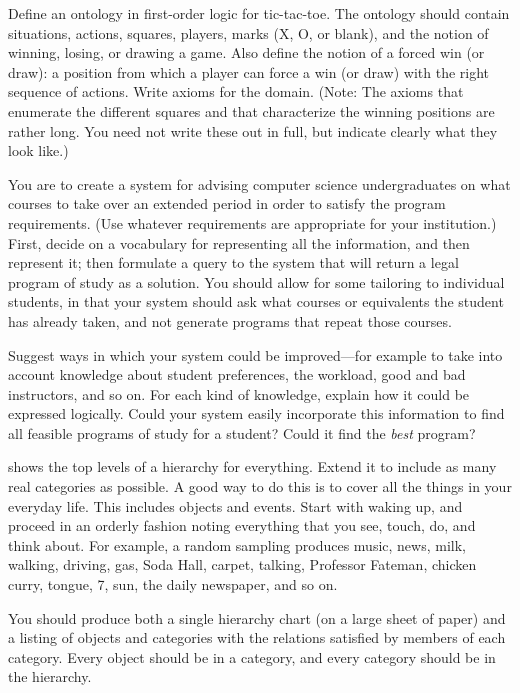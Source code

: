 
\begin{exercise}
Define an ontology in first-order logic for tic-tac-toe.  The ontology
should contain situations, actions, squares, players, marks (X, O, or
blank), and the notion of winning, losing, or drawing a game. Also
define the notion of a forced win (or draw): a position from which a
player can force a win (or draw) with the right sequence of actions.
Write axioms for the domain. (Note: The axioms that enumerate the
different squares and that characterize the winning positions are
rather long.  You need not write these out in full, but indicate
clearly what they look like.)
\end{exercise} 

\begin{iexercise}
You are to create a system for advising computer science
undergraduates on what courses to take over an extended period in
order to satisfy the program requirements. (Use whatever requirements
are appropriate for your institution.)  First, decide on a vocabulary
for representing all the information, and then represent it; then formulate
a query to the system that will return a legal program
of study as a solution. You should allow for some tailoring to
individual students, in that your system should ask what courses or
equivalents the student has already taken, and not generate programs
that repeat those courses.

Suggest ways in which your system could be improved---for example to
take into account knowledge about student preferences, the workload, good
and bad instructors, and so on. For each kind of knowledge, explain
how it could be expressed logically. Could your system easily
incorporate this information to find all feasible programs of study for a student?
Could it find the {\it best} program?
\end{iexercise} 

\begin{uexercise}
 shows the top levels of a hierarchy for
everything. Extend it to include as many real categories as possible.
A good way to do this is to cover all the things in your everyday
life.  This includes objects and events. Start with waking up, and
proceed in an orderly fashion noting everything that you see, touch,
do, and think about.  For example, a random sampling produces music,
news, milk, walking, driving, gas, Soda Hall, carpet, talking,
Professor Fateman, chicken curry, tongue, {\DollarSign}7, sun, the daily
newspaper, and so on.

You should produce both a single hierarchy chart (on a large sheet of
paper) and a listing of objects and categories with the relations
satisfied by members of each category.  Every object should be in a
category, and every category should be in the hierarchy.
\end{uexercise} 

